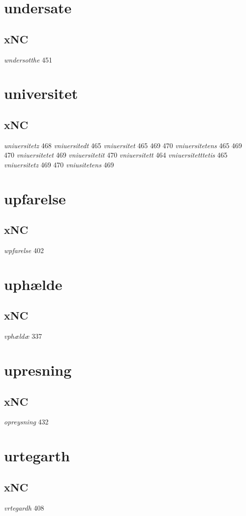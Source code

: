 \documentclass[a4paper,twocolumn]{article}
\begin{document}
\section{undersate}
\label{sec:orgd5b9b49}
\subsection{xNC}
\label{sec:orgfed4bcc}
\emph{wndersotthe} 451 
\section{universitet}
\label{sec:orgf513492}
\subsection{xNC}
\label{sec:org83764c2}
\emph{uniuersitetz} 468 \emph{vniuersitedt} 465 \emph{vniuersitet} 465 469 470 \emph{vniuersitetens} 465 469 470 \emph{vniuersitetet} 469 \emph{vniuersitetit} 470 \emph{vniuersitett} 464 \emph{vniuersitetttetis} 465 \emph{vniuersitetz} 469 470 \emph{vniusitetens} 469 
\section{upfarelse}
\label{sec:org65a2e54}
\subsection{xNC}
\label{sec:orga2f0ef6}
\emph{wpfarelse} 402 
\section{uphælde}
\label{sec:org17cf547}
\subsection{xNC}
\label{sec:org9ef38bf}
\emph{vphældæ} 337 
\section{upresning}
\label{sec:orgfba5ee8}
\subsection{xNC}
\label{sec:orgab31d93}
\emph{opreysning} 432 
\section{urtegarth}
\label{sec:orgce4a683}
\subsection{xNC}
\label{sec:orgcf10511}
\emph{vrtegardh} 408 
\end{document}
